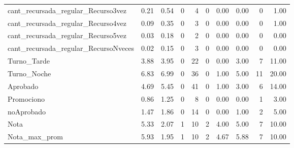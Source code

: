\begin{table}[!h]
{\begin{tabular}[t]{lrrrrrrrrr}
			\rowcolor{gray!6}  cant\_recursada\_regular\_Recurso3vez & 0.21 & 0.54 & 0 & 4 & 0 & 0.00 & 0.00 & 0 & 1.00\\
			cant\_recursada\_regular\_Recurso4vez & 0.09 & 0.35 & 0 & 3 & 0 & 0.00 & 0.00 & 0 & 1.00\\
			\rowcolor{gray!6}  cant\_recursada\_regular\_Recurso5vez & 0.03 & 0.18 & 0 & 2 & 0 & 0.00 & 0.00 & 0 & 0.00\\
			\addlinespace
			cant\_recursada\_regular\_RecursoNveces & 0.02 & 0.15 & 0 & 3 & 0 & 0.00 & 0.00 & 0 & 0.00\\
			\rowcolor{gray!6}  Turno\_Tarde & 3.88 & 3.95 & 0 & 22 & 0 & 0.00 & 3.00 & 7 & 11.00\\
			Turno\_Noche & 6.83 & 6.99 & 0 & 36 & 0 & 1.00 & 5.00 & 11 & 20.00\\
			\rowcolor{gray!6}  Aprobado & 4.69 & 5.45 & 0 & 41 & 0 & 1.00 & 3.00 & 6 & 14.00\\
			Promociono & 0.86 & 1.25 & 0 & 8 & 0 & 0.00 & 0.00 & 1 & 3.00\\
			\addlinespace
			\rowcolor{gray!6}  noAprobado & 1.47 & 1.86 & 0 & 14 & 0 & 0.00 & 1.00 & 2 & 5.00\\
			Nota & 5.33 & 2.07 & 1 & 10 & 2 & 4.00 & 5.00 & 7 & 10.00\\
			\rowcolor{gray!6}  Nota\_max\_prom & 5.93 & 1.95 & 1 & 10 & 2 & 4.67 & 5.88 & 7 & 10.00\\
			\bottomrule
	\end{tabular}}
\end{table}

